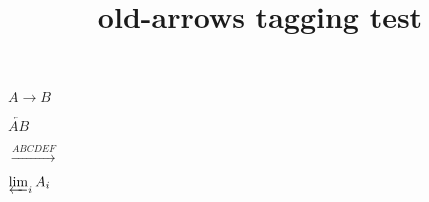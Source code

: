 \documentclass{article}
\title{old-arrows tagging test}
\begin{document}
$A\to B$

$\overleftarrow{AB}$

$\xrightarrow{ABCDEF}$

$\varprojlim_i A_i$
\end{document}
